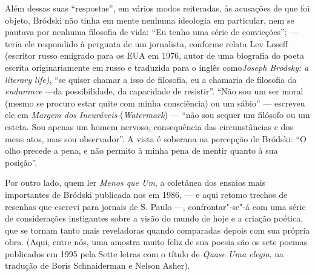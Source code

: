 Além dessas suas ``respostas'', em vários modos reiteradas, às
acusações de que foi objeto, Bródski não tinha em mente nenhuma
ideologia em particular, nem se pautava por nenhuma filosofia de vida:
``Eu tenho uma série de convicções''; --- teria ele respondido à
pergunta de um jornalista, conforme relata Lev Loseff (escritor russo emigrado
para os EUA em 1976, autor de uma biografia do poeta escrita
originariamente em russo e traduzida para o inglês como\emph{Joseph
Brodsky: a literary life)}, ``se quiser
chamar a isso de filosofia, eu a chamaria de filosofia da
\emph{endurance} ---da possibilidade, da capacidade de resistir''.
``Não sou um ser moral (mesmo se procuro estar quite com minha
consciência) ou um sábio'' --- escreveu ele em \emph{Margem dos
Incuráveis} (\emph{Watermark}) --- ``não sou sequer um filósofo ou um
esteta. Sou apenas um homem nervoso, consequência das circunstâncias e
dos meus atos, mas sou observador''. A vista é soberana na percepção de
Bródski: ``O olho precede a pena, e não permito à minha pena de mentir
quanto à sua posição''.

Por outro lado, quem ler \emph{Menos que Um}, a coletânea dos ensaios
mais importantes de Bródski publicada nos  em 1986, --- e aqui
retomo trechos de resenhas que escrevi para jornais de S. Paulo ---,
confrontar"-se"-á com uma série de considerações instigantes sobre a visão
do mundo de hoje e a criação poética, que se tornam tanto mais
reveladoras quando comparadas depois com sua própria obra. (Aqui, entre
nós, uma amostra muito feliz de sua poesia são os sete poemas publicados
em 1995 pela Sette letras com o título de \emph{Quase Uma elegia}, na
tradução de Boris Schnaiderman e Nelson Asher).

